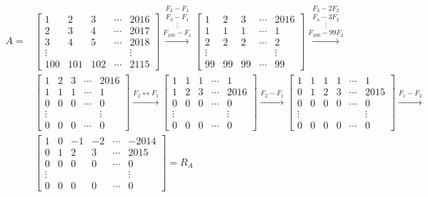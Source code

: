 \begin{enumerate}[topsep=6pt, itemsep=.4cm]
\begin{enumerate}
\begin{align*}
A = &\begin{bmatrix}1 & 2 & 3 & \cdots & 2016 \\ 2 & 3 & 4 & \cdots & 2017 \\ 3&4&5& \cdots & 2018\\ \vdots & &&& \vdots \\ 100 & 101 & 102& \cdots& 2115\end{bmatrix} \stackrel{F_2-F_1}{\stackrel{F_3 - F_1}{\stackrel{\vdots}{\stackrel{F_{100}-F_1}{\longrightarrow}}}}
\begin{bmatrix}1 & 2 & 3 & \cdots & 2016 \\ 1 & 1 & 1 & \cdots & 1 \\ 2&2&2& \cdots & 2\\ \vdots & &&& \vdots \\ 99 & 99 & 99& \cdots& 99\end{bmatrix}
\stackrel{F_3-2F_2}{\stackrel{F_4-3F_2}{\stackrel{\vdots}{\stackrel{F_{100}-99F_2}{\longrightarrow}}}} \\
&\begin{bmatrix}1 & 2 & 3 & \cdots & 2016 \\ 1 & 1 & 1 & \cdots & 1 \\ 0&0&0& \cdots & 0\\ \vdots & &&& \vdots \\ 0 & 0 & 0& \cdots& 0\end{bmatrix}
\stackrel{F_2 \leftrightarrow F_1}{\longrightarrow}
\begin{bmatrix}1 & 1 & 1 & \cdots & 1 \\ 1 & 2 & 3 & \cdots & 2016 \\ 0&0&0& \cdots & 0\\ \vdots & &&& \vdots \\ 0 & 0 & 0& \cdots& 0\end{bmatrix}
\stackrel{F_2-F_1}{\longrightarrow}
\begin{bmatrix}1 & 1 & 1 & 1 & \cdots & 1 \\ 0 & 1 & 2 & 3 & \cdots & 2015 \\ 0&0&0&0& \cdots & 0\\ \vdots & &&&& \vdots \\ 0 & 0 & 0&0& \cdots& 0\end{bmatrix}
\stackrel{F_1-F_2}{\longrightarrow} \\
&\begin{bmatrix}1 & 0 & -1 & -2 & \cdots & -2014 \\ 0 & 1 & 2 & 3 & \cdots & 2015 \\ 0&0&0&0& \cdots & 0\\ \vdots & &&&& \vdots \\ 0 & 0 & 0&0& \cdots& 0\end{bmatrix} = R_A
\end{align*}


\end{enumerate}
\end{enumerate}
